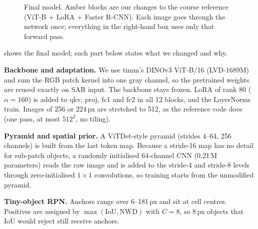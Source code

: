 \documentclass[10pt,twocolumn,letterpaper]{article}
\begin{document}
\begin{figure}[t]
{}
\caption{Final model. Amber blocks are our changes to the course reference (ViT-B + LoRA + Faster R-CNN). Each image goes through the network once; everything in the right-hand box uses only that forward pass.}
\label{fig:pipeline}
\end{figure}

 shows the final model; each part below states what we changed and why.

\textbf{Backbone and adaptation.} We use timm's DINOv3 ViT-B/16 (LVD-1689M) and sum the RGB patch kernel into one gray channel, so the pretrained weights are reused exactly on SAR input. The backbone stays frozen. LoRA of rank 80 ($\alpha{=}160$) is added to qkv, proj, fc1 and fc2 in all 12 blocks, and the LayerNorms train. Images of 256 or 224\,px are stretched to 512, as the reference code does (one pass, at most $512^2$, no tiling).

\textbf{Pyramid and spatial prior.} A ViTDet-style pyramid (strides 4--64, 256 channels) is built from the last token map. Because a stride-16 map has no detail for sub-patch objects, a randomly initialised 64-channel CNN (0.21\,M parameters) reads the raw image and is added to the stride-4 and stride-8 levels through zero-initialised $1{\times}1$ convolutions, so training starts from the unmodified pyramid.

\textbf{Tiny-object RPN.} Anchors range over 6--181\,px and sit at cell centres. Positives are assigned by $\max(\mathrm{IoU},\mathrm{NWD})$ with $C{=}8$, so 8\,px objects that IoU would reject still receive anchors.
\end{document}
